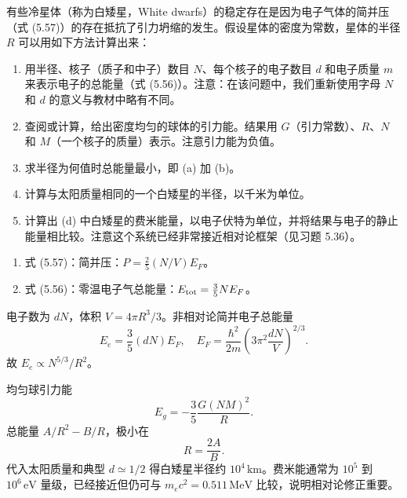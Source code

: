 \begin{question}
有些冷星体（称为白矮星，White dwarfs）的稳定存在是因为电子气体的简并压（式 (5.57)）的存在抵抗了引力坍缩的发生。假设星体的密度为常数，星体的半径 $R$ 可以用如下方法计算出来：
\begin{enumerate}
\item 用半径、核子（质子和中子）数目 $N$、每个核子的电子数目 $d$ 和电子质量 $m$ 来表示电子的总能量（式 (5.56)）。注意：在该问题中，我们重新使用字母 $N$ 和 $d$ 的意义与教材中略有不同。
\item 查阅或计算，给出密度均匀的球体的引力能。结果用 $G$（引力常数）、$R$、$N$ 和 $M$（一个核子的质量）表示。注意引力能为负值。
\item 求半径为何值时总能量最小，即 (a) 加 (b)。
\item 计算与太阳质量相同的一个白矮星的半径，以千米为单位。
\item 计算出 (d) 中白矮星的费米能量，以电子伏特为单位，并将结果与电子的静止能量相比较。注意这个系统已经非常接近相对论框架（见习题 5.36）。
\end{enumerate}

\par\smallskip
{}
\begin{enumerate}[leftmargin=2.2em,itemsep=0.12em,topsep=0.12em,parsep=0pt]
\item 式 (5.57)：简并压：$P=\frac25(N/V)E_F$。
\item 式 (5.56)：零温电子气总能量：$E_{\rm tot}=\frac35NE_F$。
\end{enumerate}

\end{question}
\begin{solution}

电子数为 $dN$，体积 $V=4\pi R^3/3$。非相对论简并电子总能量
\[
E_e=\frac35(dN)E_F,
\quad
E_F=\frac{\hbar^2}{2m}\left(3\pi^2\frac{dN}{V}\right)^{2/3}.
\]
故 $E_e\propto N^{5/3}/R^2$。

均匀球引力能
\[
E_g=-\frac35\frac{G(NM)^2}{R}.
\]
总能量 $A/R^2-B/R$，极小在
\[
R=\frac{2A}{B}.
\]
代入太阳质量和典型 $d\simeq1/2$ 得白矮星半径约 $10^4\,\mathrm{km}$。费米能通常为 $10^5$ 到 $10^6\,\mathrm{eV}$ 量级，已经接近但仍可与 $m_ec^2=0.511\,\mathrm{MeV}$ 比较，说明相对论修正重要。

\end{solution}

